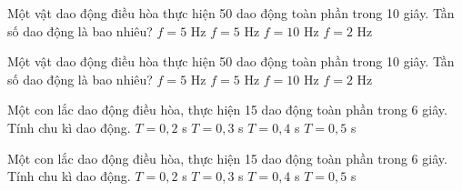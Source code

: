 \begin{ex}
Một vật dao động điều hòa thực hiện 50 dao động toàn phần trong 10 giây. Tần số dao động là bao nhiêu?
\choice
{$f = 5$ Hz}
{\True $f = 5$ Hz}
{$f = 10$ Hz}
{$f = 2$ Hz}
\end{ex}

\begin{ex}
Một vật dao động điều hòa thực hiện 50 dao động toàn phần trong 10 giây. Tần số dao động là bao nhiêu?
\choice
{$f = 5$ Hz}
{\True $f = 5$ Hz}
{$f = 10$ Hz}
{$f = 2$ Hz}
\end{ex}

\begin{ex}
Một con lắc dao động điều hòa, thực hiện 15 dao động toàn phần trong 6 giây. Tính chu kì dao động.
\choice
{$T = 0{,}2$ s}
{$T = 0{,}3$ s}
{\True $T = 0{,}4$ s}
{$T = 0{,}5$ s}
\end{ex}

\begin{ex}
Một con lắc dao động điều hòa, thực hiện 15 dao động toàn phần trong 6 giây. Tính chu kì dao động.
\choice
{$T = 0{,}2$ s}
{$T = 0{,}3$ s}
{\True $T = 0{,}4$ s}
{$T = 0{,}5$ s}
\end{ex}

